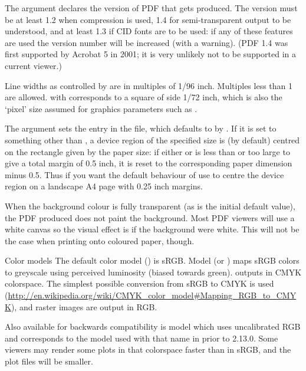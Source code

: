 \begin{Details}
The  argument declares the version of PDF that gets
produced.  The version must be at least 1.2 when compression is used,
1.4 for semi-transparent output to be understood, and at least 1.3 if
CID fonts are to be used: if any of these features are used the
version number will be increased (with a warning).  (PDF 1.4 was first
supported by Acrobat 5 in 2001; it is very unlikely not to be
supported in a current viewer.)

Line widths as controlled by  are in multiples of
1/96 inch.  Multiples less than 1 are allowed.   with
 corresponds to a square of side 1/72 inch, which is
also the `pixel' size assumed for graphics parameters such as
.

The  argument sets the  entry in the file,
which defaults to  by .  If it is set to
something other than , a device region of the
specified size is (by default) centred on the rectangle given by the
paper size: if either  or  is less
than  or too large to give a total margin of 0.5 inch, it is
reset to the corresponding paper dimension minus 0.5.  Thus if you
want the default behaviour of  use
 to centre the device region
on a landscape A4 page with 0.25 inch margins.

When the background colour is fully transparent (as is the initial
default value), the PDF produced does not paint the background.  Most
PDF viewers will use a white canvas so the visual effect is if the
background were white.  This will not be the case when printing onto
coloured paper, though.
\end{Details}
%
\begin{Section}{Color models}
The default color model () is sRGB.  Model 
(or ) maps sRGB colors to greyscale using perceived
luminosity (biased towards green).   outputs in CMYK
colorspace.  The simplest possible conversion from sRGB to CMYK is
used
(\url{http://en.wikipedia.org/wiki/CMYK_color_model#Mapping_RGB_to_CMYK}),
and raster images are output in RGB.

Also available for backwards compatibility is model  which
uses uncalibrated RGB and corresponds to the model used with that name
in \R{} prior to 2.13.0.  Some viewers may render some plots in that
colorspace faster than in sRGB, and the plot files will be smaller.
\end{Section}
